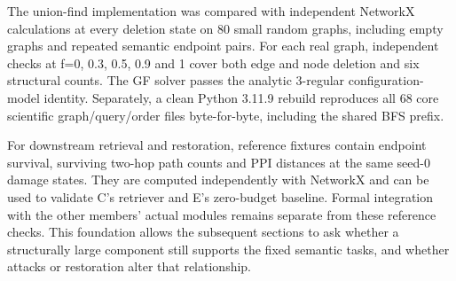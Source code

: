 The union-find implementation was compared with independent NetworkX
calculations at every deletion state on 80 small random graphs,
including empty graphs and repeated semantic endpoint pairs. For each
real graph, independent checks at f=0, 0.3, 0.5, 0.9 and 1 cover both
edge and node deletion and six structural counts. The GF solver passes
the analytic 3-regular configuration-model identity. Separately, a clean
Python 3.11.9 rebuild reproduces all 68 core scientific
graph/query/order files byte-for-byte, including the shared BFS prefix.

For downstream retrieval and restoration, reference fixtures contain
endpoint survival, surviving two-hop path counts and PPI distances at
the same seed-0 damage states. They are computed independently with
NetworkX and can be used to validate C's retriever and E's zero-budget
baseline. Formal integration with the other members' actual modules
remains separate from these reference checks. This foundation allows the
subsequent sections to ask whether a structurally large component still
supports the fixed semantic tasks, and whether attacks or restoration
alter that relationship.
